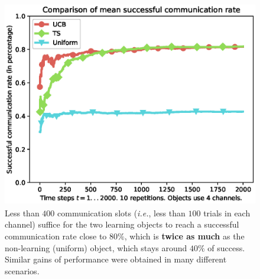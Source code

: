 \begin{figure}[!t]
	\centering
    \includegraphics[height=9.0cm]{plot_datafile_append_Uniform_vs_UCB_vs_TS.eps}
    \caption{Less than $400$ communication slots (\emph{i.e.}, less than $100$ trials in each channel) suffice for the two learning objects to reach a successful communication rate close to $80\%$, which is \textbf{twice as much} as the non-learning (uniform) object, which stays around $40\%$ of success. Similar gains of performance were obtained in many different scenarios.}
    \label{fig:42:plot_datafile_append_Uniform_vs_UCB_vs_TS}
\end{figure}



